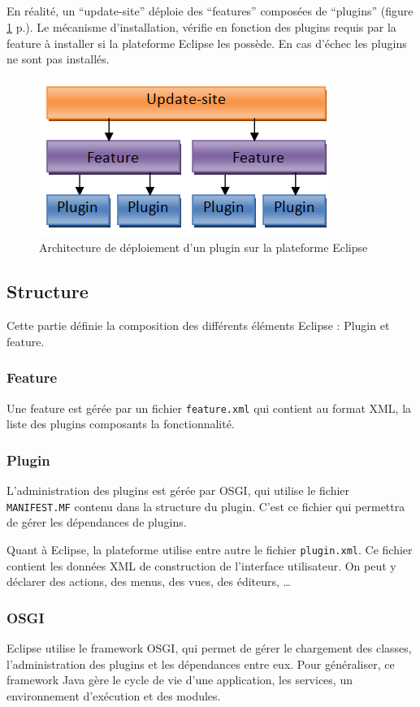 \subparagraph*{}
En réalité, un ``update-site'' déploie des ``features'' composées de ``plugins'' (figure \ref{figure:EclipsePlatformDeploiement} p.\pageref{figure:EclipsePlatformDeploiement}).
Le mécanisme d'installation, vérifie en fonction des plugins requis par la feature à installer si la plateforme Eclipse les possède.
En cas d'échec les plugins ne sont pas installés.

\begin{figure}[!h]
\begin{center}
  \includegraphics[scale=.55]{images/archi_eclipse_deploiement.png}
  \caption{Architecture de déploiement d'un plugin sur la plateforme Eclipse}
  \label{figure:EclipsePlatformDeploiement}
\end{center}
\end{figure}

\subsection{Structure}

Cette partie définie la composition des différents éléments Eclipse : Plugin et feature.

\subsubsection{Feature}

Une feature est gérée par un fichier \texttt{feature.xml} qui contient au format XML, la liste des plugins composants la fonctionnalité.

\subsubsection{Plugin}

L'administration des plugins est gérée par OSGI, qui utilise le fichier \texttt{MANIFEST.MF} contenu dans la structure du plugin. 
C'est ce fichier qui permettra de gérer les dépendances de plugins.

Quant à Eclipse, la plateforme utilise entre autre le fichier \texttt{plugin.xml}.
Ce fichier contient les données XML de construction de l'interface utilisateur.
On peut y déclarer des actions, des menus, des vues, des éditeurs, \ldots

\subsubsection{OSGI}\label{OSGI}

Eclipse utilise le framework OSGI, qui permet de gérer le chargement des classes, l'administration des plugins et les dépendances entre eux. 
Pour généraliser, ce framework Java gère le cycle de vie d'une application, les services, un environnement d'exécution et des modules.
